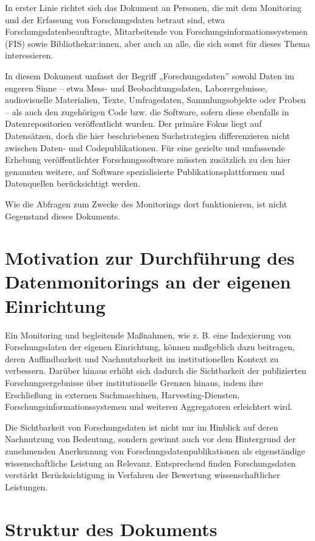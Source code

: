\documentclass[
  ngerman,
  letterpaper,
  DIV=11]{scrreprt}
\begin{document}
In erster Linie richtet sich das Dokument an Personen, die mit dem
Monitoring und der Erfassung von Forschungsdaten betraut sind, etwa
Forschungsdatenbeauftragte, Mitarbeitende von
Forschungsinformationssystemen (FIS) sowie Bibliothekar:innen, aber auch
an alle, die sich sonst für dieses Thema interessieren.

In diesem Dokument umfasst der Begriff „Forschungsdaten'' sowohl Daten
im engeren Sinne -- etwa Mess- und Beobachtungsdaten, Laborergebnisse,
audiovisuelle Materialien, Texte, Umfragedaten, Sammlungsobjekte oder
Proben -- als auch den zugehörigen Code bzw. die Software, sofern diese
ebenfalls in Datenrepositorien veröffentlicht wurden. Der primäre Fokus
liegt auf Datensätzen, doch die hier beschriebenen Suchstrategien
differenzieren nicht zwischen Daten- und Codepublikationen. Für eine
gezielte und umfassende Erhebung veröffentlichter Forschungssoftware
müssten zusätzlich zu den hier genannten weitere, auf Software
spezialisierte Publikationsplattformen und Datenquellen berücksichtigt
werden.

Wie die Abfragen zum Zwecke des Monitorings dort funktionieren, ist
nicht Gegenstand dieses Dokuments.

\section{Motivation zur Durchführung des Datenmonitorings an der eigenen
Einrichtung}\label{motivation-zur-durchfuxfchrung-des-datenmonitorings-an-der-eigenen-einrichtung}

Ein Monitoring und begleitende Maßnahmen, wie z. B. eine Indexierung von
Forschungsdaten der eigenen Einrichtung, können maßgeblich dazu
beitragen, deren Auffindbarkeit und Nachnutzbarkeit im institutionellen
Kontext zu verbessern. Darüber hinaus erhöht sich dadurch die
Sichtbarkeit der publizierten Forschungsergebnisse über institutionelle
Grenzen hinaus, indem ihre Erschließung in externen Suchmaschinen,
Harvesting-Diensten, Forschungsinformationssystemen und weiteren
Aggregatoren erleichtert wird.

Die Sichtbarkeit von Forschungsdaten ist nicht nur im Hinblick auf deren
Nachnutzung von Bedeutung, sondern gewinnt auch vor dem Hintergrund der
zunehmenden Anerkennung von Forschungsdatenpublikationen als
eigenständige wissenschaftliche Leistung an Relevanz. Entsprechend
finden Forschungsdaten verstärkt Berücksichtigung in Verfahren der
Bewertung wissenschaftlicher Leistungen.

\section{Struktur des Dokuments}\label{struktur-des-dokuments}
\end{document}
